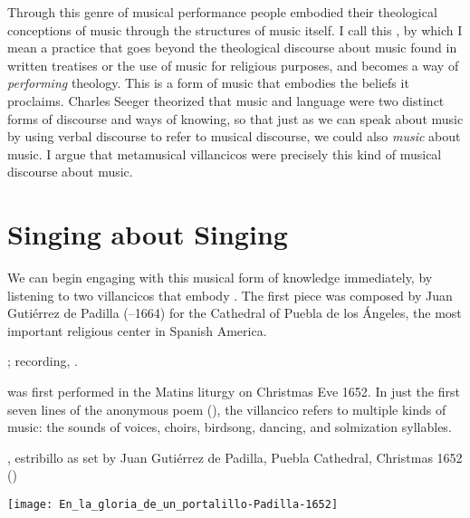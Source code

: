 
Through this genre of musical performance people embodied their theological
conceptions of music through the structures of music itself.
I call this , by which I mean a practice that goes
beyond the theological discourse about music found in written treatises or the
use of music for religious purposes, and becomes a way of \emph{performing}
theology.
This is a form of music that embodies the beliefs it proclaims.
Charles Seeger theorized that music and language were two distinct forms of
discourse and ways of knowing, so that just as we can speak about music by
using verbal discourse to refer to musical discourse, we could also
\emph{music} about music.%
    \Autocites
    {Seeger:Unitary}
    {Small:Musicking}
I argue that metamusical villancicos were precisely this kind of musical
discourse about music.


\section{Singing about Singing}

We can begin engaging with this musical form of knowledge immediately, by
listening to two villancicos that embody .%
    \Autocites
    {Murata:Singing}
The first piece was composed by Juan Gutiérrez de Padilla (--1664)
for the Cathedral of Puebla de los Ángeles, the most important religious center
in Spanish America.%
\begin{Footnote}
    ; 
    recording, \autocite{Padilla:1652ChristmasCD}.
\end{Footnote}
 was first performed in the Matins liturgy
on Christmas Eve 1652.  
In just the first seven lines of the anonymous poem
(), the villancico
refers to multiple kinds of music: the sounds of voices, choirs, birdsong,
dancing, and solmization syllables.


\begin{poemexample}
    \caption{, estribillo as set by Juan
    Gutiérrez de Padilla, Puebla Cathedral, Christmas 1652 ()}
    \label{poem:En_la_gloria_de_un_portalillo-Padilla-1652}
    \texttt{[image: En\_la\_gloria\_de\_un\_portalillo-Padilla-1652]}
\end{poemexample}


